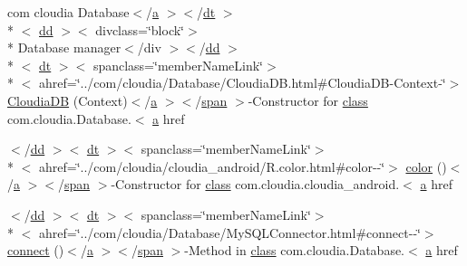 \begin{DoxyCompactItemize}
 com cloudia Database$<$/\hyperlink{style_8css_a5e8981582017bb8b84c21f148345d1f7}{a} $>$$<$/\hyperlink{stylesheet_8css_a107565fb4039d33b041380d6e0ea1d80}{dt} $>$\\*
$<$ \hyperlink{stylesheet_8css_a47f4718a86835a7771ec592ece845221}{dd} $>$$<$ divclass=\char`\"{}block\char`\"{}$>$\\*
 Database manager$<$/div $>$$<$/\hyperlink{stylesheet_8css_a47f4718a86835a7771ec592ece845221}{dd} $>$\\*
$<$ \hyperlink{stylesheet_8css_a107565fb4039d33b041380d6e0ea1d80}{dt} $>$$<$ spanclass=\char`\"{}member\-Name\-Link\char`\"{}$>$\\*
$<$ ahref=\char`\"{}../com/cloudia/Database/Cloudia\-D\-B.\-html\#Cloudia\-D\-B-\/Context-\/\char`\"{}$>$ \hyperlink{index-3_8html_acb4be13b457a39ff78ddb554837f8e2a}{Cloudia\-D\-B} (Context)$<$/\hyperlink{style_8css_a5e8981582017bb8b84c21f148345d1f7}{a} $>$$<$/\hyperlink{stylesheet_8css_a8343996ebcf16220b04e54659aac31cc}{span} $>$-\/Constructor for \hyperlink{_tools_8html_acf06f836132665ba8114f5a414c2403f}{class} com.\-cloudia.\-Database.$<$ \hyperlink{style_8css_a5e8981582017bb8b84c21f148345d1f7}{a} href
\item 
$<$/\hyperlink{stylesheet_8css_a47f4718a86835a7771ec592ece845221}{dd} $>$$<$ \hyperlink{stylesheet_8css_a107565fb4039d33b041380d6e0ea1d80}{dt} $>$$<$ spanclass=\char`\"{}member\-Name\-Link\char`\"{}$>$\\*
$<$ ahref=\char`\"{}../com/cloudia/cloudia\-\_\-android/R.\-color.\-html\#color-\/-\/\char`\"{}$>$ \hyperlink{index-3_8html_a1491993f9d93ab4bc0fdec8302f292a3}{color} ()$<$/\hyperlink{style_8css_a5e8981582017bb8b84c21f148345d1f7}{a} $>$$<$/\hyperlink{stylesheet_8css_a8343996ebcf16220b04e54659aac31cc}{span} $>$-\/Constructor for \hyperlink{_tools_8html_acf06f836132665ba8114f5a414c2403f}{class} com.\-cloudia.\-cloudia\-\_\-android.$<$ \hyperlink{style_8css_a5e8981582017bb8b84c21f148345d1f7}{a} href
\item 
$<$/\hyperlink{stylesheet_8css_a47f4718a86835a7771ec592ece845221}{dd} $>$$<$ \hyperlink{stylesheet_8css_a107565fb4039d33b041380d6e0ea1d80}{dt} $>$$<$ spanclass=\char`\"{}member\-Name\-Link\char`\"{}$>$\\*
$<$ ahref=\char`\"{}../com/cloudia/Database/My\-S\-Q\-L\-Connector.\-html\#connect-\/-\/\char`\"{}$>$ \hyperlink{index-3_8html_a7bbaa4495fc62efaa6e45b4204d77a6d}{connect} ()$<$/\hyperlink{style_8css_a5e8981582017bb8b84c21f148345d1f7}{a} $>$$<$/\hyperlink{stylesheet_8css_a8343996ebcf16220b04e54659aac31cc}{span} $>$-\/Method in \hyperlink{_tools_8html_acf06f836132665ba8114f5a414c2403f}{class} com.\-cloudia.\-Database.$<$ \hyperlink{style_8css_a5e8981582017bb8b84c21f148345d1f7}{a} href
$$
\end{DoxyCompactItemize}
